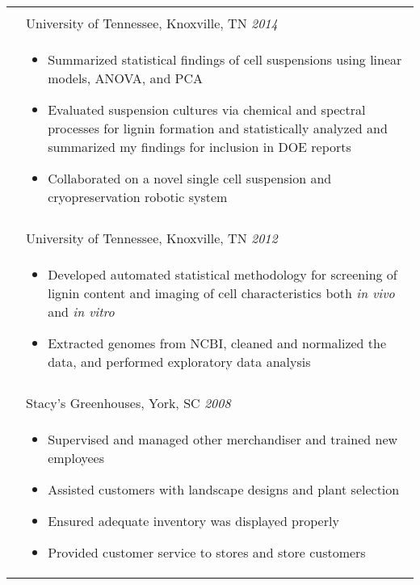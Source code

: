 \documentclass[10pt]{article}
\begin{document}
\begin{minipage}[ht]{.75\linewidth}
\begin{tabularx}{\linewidth}{p{1.8cm}M}
       &  \\
       & University of Tennessee, Knoxville, TN \textit{2014 } \\
       & \begin{itemize}[topsep=-12pt,parsep=0em]
            \setlength\itemsep{0em}
            \item Summarized statistical findings of cell suspensions using linear models, ANOVA, and PCA %
            \item Evaluated suspension cultures via chemical and spectral processes for lignin formation and statistically analyzed and summarized my findings for inclusion in DOE reports %
            \item Collaborated on a novel single cell suspension and cryopreservation robotic system %
         \end{itemize} \\
       &  \\
       & University of Tennessee, Knoxville, TN \textit{2012 } \\
       & \begin{itemize}[topsep=-12pt,parsep=0em]
            \setlength\itemsep{0em}
            \item Developed automated statistical methodology for screening of lignin content and imaging of cell characteristics both \textit{in vivo} and \textit{in vitro} %
            \item Extracted genomes from NCBI, cleaned and normalized the data, and performed exploratory data analysis
         \end{itemize} \\
      &  \\
      & Stacy's Greenhouses, York, SC \textit{2008 } \\
      & \begin{itemize}[topsep=-12pt,parsep=0em]
           \setlength\itemsep{0em}
           \item Supervised and managed other merchandiser and trained new employees %
           \item Assisted customers with landscape designs and plant selection %
           \item Ensured adequate inventory was displayed properly %
           \item Provided customer service to stores and store customers

\end{itemize}
\end{tabularx}
\end{minipage}
\end{document}
